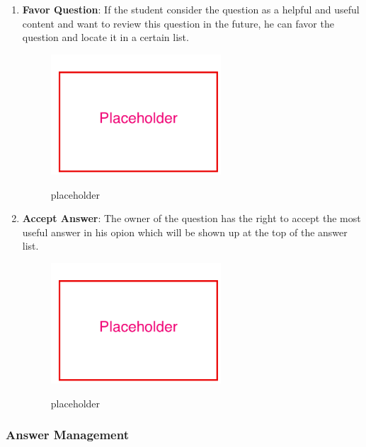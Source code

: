 \begin{enumerate}
\item
\textbf{Favor Question}: If the student consider the question as a helpful and useful content and want to review this question in the future, he can favor the question and locate it in a certain list.

\begin{figure}[!htbp]
  \caption{placeholder}
  \centering
    \includegraphics[width=0.6\textwidth]{Figures/placeholder.png}
  \label{fig:placeholder}
\end{figure}

\item
\textbf{Accept Answer}: The owner of the question has the right to accept the most useful answer in his opion which will be shown up at the top of the answer list.

\begin{figure}[!htbp]
  \caption{placeholder}
  \centering
    \includegraphics[width=0.6\textwidth]{Figures/placeholder.png}
  \label{fig:placeholder}
\end{figure}

\end{enumerate}

\subsubsection{Answer Management}

